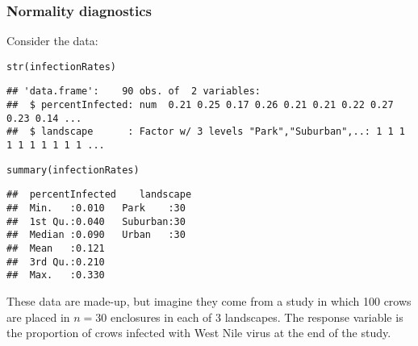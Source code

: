 \documentclass[color=usenames,dvipsnames]{beamer}\usepackage[]{graphicx}\usepackage[]{color}
\makeatletter
\newcommand{\hlstd}[1]{\textcolor[rgb]{0,0,0}{#1}}%
\newcommand{\hlkwd}[1]{\textcolor[rgb]{0.004,0.004,0.506}{#1}}%
\newenvironment{kframe}{%
 \def\at@end@of@kframe{}%
 \ifinner\ifhmode%
  \def\at@end@of@kframe{\end{minipage}}%
  \begin{minipage}{\columnwidth}%
 \fi\fi%
 \def\FrameCommand##1{\hskip\@totalleftmargin \hskip-\fboxsep
 \colorbox{shadecolor}{##1}\hskip-\fboxsep
     \hskip-\linewidth \hskip-\@totalleftmargin \hskip\columnwidth}%
 \MakeFramed {\advance\hsize-\width
   \@totalleftmargin\z@ \linewidth\hsize
   \@setminipage}}%
 {\par\unskip\endMakeFramed%
 \at@end@of@kframe}
\newenvironment{knitrout}{}{} %
\makeatother
\begin{document}
\begin{frame}[fragile]
  \frametitle{Normality diagnostics}

  {%
    Consider the data:}
  \scriptsize %
\begin{knitrout}
\color{fgcolor}\begin{kframe}
\begin{alltt}
\hlkwd{str}\hlstd{(infectionRates)}
\end{alltt}
\begin{verbatim}
## 'data.frame':	90 obs. of  2 variables:
##  $ percentInfected: num  0.21 0.25 0.17 0.26 0.21 0.21 0.22 0.27 0.23 0.14 ...
##  $ landscape      : Factor w/ 3 levels "Park","Suburban",..: 1 1 1 1 1 1 1 1 1 1 ...
\end{verbatim}
\begin{alltt}
\hlkwd{summary}\hlstd{(infectionRates)}
\end{alltt}
\begin{verbatim}
##  percentInfected    landscape 
##  Min.   :0.010   Park    :30  
##  1st Qu.:0.040   Suburban:30  
##  Median :0.090   Urban   :30  
##  Mean   :0.121                
##  3rd Qu.:0.210                
##  Max.   :0.330
\end{verbatim}
\end{kframe}
\end{knitrout}
  \normalsize %
These data are made-up, but imagine they come from a study in which
100 crows are placed in $n=30$ enclosures in each of 3 landscapes. The
response variable is the proportion of crows infected with West Nile
virus at the end of the study. \\
\end{frame}











\end{document}
